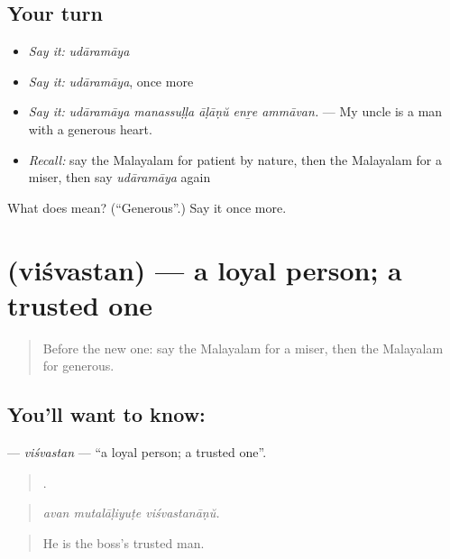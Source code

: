 \subsection*{Your turn}
\begin{itemize}
\raggedright
  \item \emph{Say it:} \emph{udāramāya}
  \item \emph{Say it:} \emph{udāramāya}, once more
  \item \emph{Say it:} \emph{udāramāya manassuḷḷa āḷāṇŭ enṟe ammāvan.} — My uncle is a man with a generous heart.
  \item \emph{Recall:} say the Malayalam for patient by nature, then the Malayalam for a miser, then say \emph{udāramāya} again
\end{itemize}

\begin{tcolorbox}[breakable,colback=teal!4,colframe=teal!35!black,title={Before you move on}]
What does  mean? (\textquotedblleft{}Generous\textquotedblright{}.) Say it once more.
\end{tcolorbox}
\section[\texorpdfstring{\ml{വിശ്വസ്തൻ} (viśvastan)}{വിശ്വസ്തൻ (viśvastan)}]{ (viśvastan) — a loyal person; a trusted one}

\label{lesson:ML-C527-visvastan}



\begin{quote}
Before the new one: say the Malayalam for a miser, then the Malayalam for generous.
\end{quote}

\subsection*{You'll want to know: }
\textbf{} — \emph{viśvastan} — \textquotedblleft{}a loyal person; a trusted one\textquotedblright{}.

\begin{quote}
  .
\end{quote}

\begin{quote}
\emph{avan mutalāḷiyuṭe viśvastanāṇŭ.}
\end{quote}

\begin{quote}
He is the boss's trusted man.
\end{quote}

